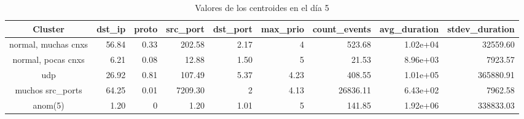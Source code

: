 \begin{table}[h!]
    \begingroup
    \setlength{\tabcolsep}{2pt} %
    \renewcommand{\arraystretch}{2} %
    \hspace*{-3cm}
    \begin{tabular}{|c|r|r|r|r|r|r|r|r|}
    \hline
    \textbf{Cluster}    & \textbf{dst\_ip} & \textbf{proto} & \textbf{src\_port} & \textbf{dst\_port} & \textbf{max\_prio} & \textbf{count\_events} & \textbf{avg\_duration} & \textbf{stdev\_duration} \\ \hline
    normal, muchas cnxs & 56.84            & 0.33           & 202.58             & 2.17               & 4                  & 523.68                 & 1.02e+04               & 32559.60                 \\ \hline
    normal, pocas cnxs  & 6.21             & 0.08           & 12.88              & 1.50               & 5                  & 21.53                  & 8.96e+03               & 7923.57                  \\ \hline
    udp                 & 26.92            & 0.81           & 107.49             & 5.37               & 4.23               & 408.55                 & 1.01e+05               & 365880.91                \\ \hline
    muchos src\_ports   & 64.25            & 0.01           & 7209.30            & 2                  & 4.13               & 26836.11               & 6.43e+02               & 7962.58                  \\ \hline
    anom(5)             & 1.20             & 0              & 1.20               & 1.01               & 5                  & 141.85                 & 1.92e+06               & 338833.03                \\ \hline
    \end{tabular}
    \endgroup
\bigskip
\caption{Valores de los centroides en el día 5}
\bigskip
\label{tab:dia5}
\end{table}

